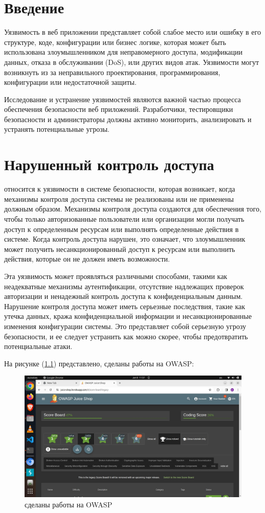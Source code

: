 \chapter*{Введение}

Уязвимость в веб приложении представляет собой слабое место или ошибку в его структуре, коде, конфигурации или бизнес логике, которая может быть использована злоумышленником для неправомерного доступа, модификации данных, отказа в обслуживании (DoS), или других видов атак. Уязвимости могут возникнуть из за неправильного проектирования, программирования, конфигурации или недостаточной защиты.

Исследование и устранение уязвимостей являются важной частью процесса обеспечения безопасности веб приложений. Разработчики, тестировщики безопасности и администраторы должны активно мониторить, анализировать и устранять потенциальные угрозы.

\chapter{Нарушенный контроль доступа}

относится к уязвимости в системе безопасности, которая возникает, когда механизмы контроля доступа системы не реализованы или не применены должным образом. Механизмы контроля доступа создаются для обеспечения того, чтобы только авторизованные пользователи или организации могли получать доступ к определенным ресурсам или выполнять определенные действия в системе. Когда контроль доступа нарушен, это означает, что злоумышленник может получить несанкционированный доступ к ресурсам или выполнить действия, которые он не должен иметь возможности.

Эта уязвимость может проявляться различными способами, такими как неадекватные механизмы аутентификации, отсутствие надлежащих проверок авторизации и ненадежный контроль доступа к конфиденциальным данным. Нарушение контроля доступа может иметь серьезные последствия, такие как утечка данных, кража конфиденциальной информации и несанкционированные изменения конфигурации системы. Это представляет собой серьезную угрозу безопасности, и ее следует устранить как можно скорее, чтобы предотвратить потенциальные атаки.

На рисунке (\ref{fig:mel-spec}) представлено, сделаны работы на OWASP: 
\begin{figure}[H]
	\centering
	\includegraphics[width=1\linewidth]{images/image.png}
	\caption{сделаны работы на OWASP}
	\label{fig:mel-spec}
\end{figure}

